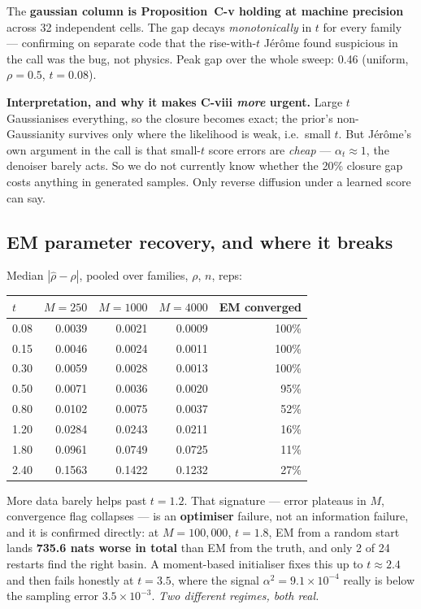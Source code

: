\documentclass[11pt,a4paper]{article}
\begin{document}
\noindent
The \textbf{gaussian column is Proposition~C-v holding at machine precision} across 32
independent cells. The gap decays \emph{monotonically} in $t$ for every family --- confirming
on separate code that the rise-with-$t$ J\'er\^ome found suspicious in the call was the bug,
not physics. Peak gap over the whole sweep: 0.46 (uniform, $\rho=0.5$, $t=0.08$).

\begin{keybox}
\textbf{Interpretation, and why it makes C-viii \emph{more} urgent.} Large $t$ Gaussianises
everything, so the closure becomes exact; the prior's non-Gaussianity survives only where
the likelihood is weak, i.e.\ small $t$. But J\'er\^ome's own argument in the call is that
small-$t$ score errors are \emph{cheap} --- $\alpha_t\approx 1$, the denoiser barely acts.
So we do not currently know whether the 20\% closure gap costs anything in generated
samples. Only reverse diffusion under a learned score can say.
\end{keybox}

\subsection{EM parameter recovery, and where it breaks}

Median $|\hat\rho - \rho|$, pooled over families, $\rho$, $n$, reps:

\begin{center}
\begin{tabular}{@{}lrrrr@{}}
\toprule
$t$ & $M=250$ & $M=1000$ & $M=4000$ & EM converged \\
\midrule
0.08 & 0.0039 & 0.0021 & 0.0009 & 100\% \\
0.15 & 0.0046 & 0.0024 & 0.0011 & 100\% \\
0.30 & 0.0059 & 0.0028 & 0.0013 & 100\% \\
0.50 & 0.0071 & 0.0036 & 0.0020 & 95\% \\
0.80 & 0.0102 & 0.0075 & 0.0037 & 52\% \\
1.20 & 0.0284 & 0.0243 & 0.0211 & 16\% \\
1.80 & 0.0961 & 0.0749 & 0.0725 & 11\% \\
2.40 & 0.1563 & 0.1422 & 0.1232 & 27\% \\
\bottomrule
\end{tabular}
\end{center}

\noindent
More data barely helps past $t=1.2$. That signature --- error plateaus in $M$, convergence
flag collapses --- is an \textbf{optimiser} failure, not an information failure, and it is
confirmed directly: at $M=100{,}000$, $t=1.8$, EM from a random start lands \textbf{735.6
nats worse in total} than EM from the truth, and only 2 of 24 restarts find the right basin.
A moment-based initialiser fixes this up to $t\approx 2.4$ and then fails honestly at
$t=3.5$, where the signal $\alpha^2 = 9.1\times10^{-4}$ really is below the sampling error
$3.5\times10^{-3}$. \emph{Two different regimes, both real.}
\end{document}
